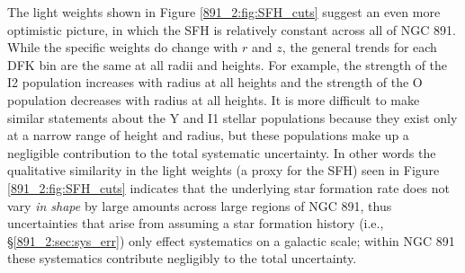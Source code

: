 




The light weights shown in Figure \ref{891_2:fig:SFH_cuts} suggest an even
more optimistic picture, in which the SFH is relatively constant
across all of NGC 891. While the specific weights do change with $r$
and $z$, the general trends for each DFK bin are the same at all radii
and heights. For example, the strength of the I2 population increases
with radius at all heights and the strength of the O population
decreases with radius at all heights. It is more difficult to make
similar statements about the Y and I1 stellar populations because they
exist only at a narrow range of height and radius, but these
populations make up a negligible contribution to the total systematic
uncertainty. In other words the qualitative similarity in the light
weights (a proxy for the SFH) seen in Figure \ref{891_2:fig:SFH_cuts}
indicates that the underlying star formation rate does not vary
\emph{in shape} by large amounts across large regions of NGC 891, thus
uncertainties that arise from assuming a star formation history (i.e.,
\S\ref{891_2:sec:sys_err}) only effect systematics on a galactic scale;
within NGC 891 these systematics contribute negligibly to the total
uncertainty.

